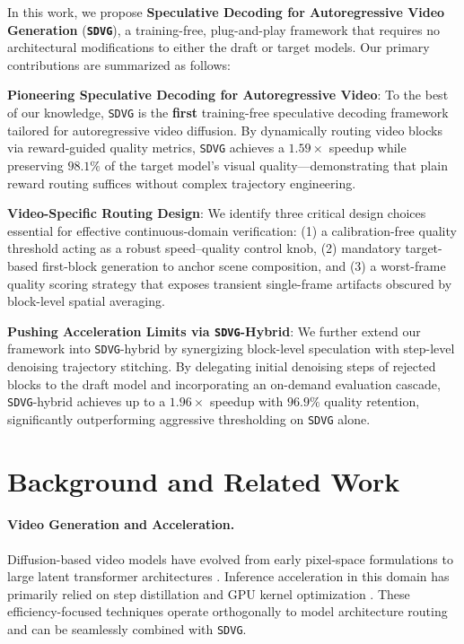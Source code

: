\documentclass{article} %
\begin{document}
In this work, we propose \textbf{Speculative Decoding for Autoregressive Video Generation} (\textbf{\texttt{SDVG}}), a training-free, plug-and-play framework that requires no architectural modifications to either the draft or target models. Our primary contributions are summarized as follows:
\begin{compactitem}[\textbullet]
  \item \textbf{Pioneering Speculative Decoding for Autoregressive Video}: To the best of our knowledge, \texttt{SDVG} is the \textbf{first} training-free speculative decoding framework tailored for autoregressive video diffusion. By dynamically routing video blocks via reward-guided quality metrics, \texttt{SDVG} achieves a $1.59\times$ speedup while preserving $98.1\%$ of the target model's visual quality—demonstrating that plain reward routing suffices without complex trajectory engineering.
  \item \textbf{Video-Specific Routing Design}: We identify three critical design choices essential for effective continuous-domain verification: (1) a calibration-free quality threshold acting as a robust speed--quality control knob, (2) mandatory target-based first-block generation to anchor scene composition, and (3) a worst-frame quality scoring strategy that exposes transient single-frame artifacts obscured by block-level spatial averaging.
  \item \textbf{Pushing Acceleration Limits via \texttt{SDVG}-Hybrid}: We further extend our framework into \texttt{SDVG}-hybrid by synergizing block-level speculation with step-level denoising trajectory stitching. By delegating initial denoising steps of rejected blocks to the draft model and incorporating an on-demand evaluation cascade, \texttt{SDVG}-hybrid achieves up to a $1.96\times$ speedup with $96.9\%$ quality retention, significantly outperforming aggressive thresholding on \texttt{SDVG} alone.
\end{compactitem}

\section{Background and Related Work}

\paragraph{Video Generation and Acceleration.}
Diffusion-based video models have evolved from early pixel-space formulations \citep{ho2022videodiffusionmodels} to large latent transformer architectures \citep{videoworldsimulators2024,polyak2024movie}. Inference acceleration in this domain has primarily relied on step distillation \citep{yin2024onestepdiffusiondistributionmatching,zhang2025turbodiffusion,wang2024phased} and GPU kernel optimization \citep{zhang2025sageattention3,zhangspargeattention}. These efficiency-focused techniques operate orthogonally to model architecture routing and can be seamlessly combined with \texttt{SDVG}.
\end{document}
